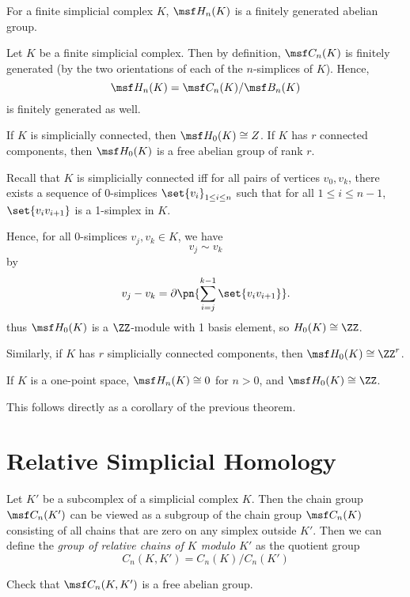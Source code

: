 \begin{problem}[18.7]
  For a finite simplicial complex $K$, $\msf H_n(K)$ is a finitely
  generated abelian group.
\end{problem}
\begin{solution}
  Let $K$ be a finite simplicial complex. Then by definition, $\msf
  C_n(K)$ is finitely generated (by the two orientations of each of
  the $n$-simplices of $K$). Hence,
  \[
    \msf H_n(K) = \msf C_n(K)/\msf B_n(K)
  \]
  is finitely generated as well.
\end{solution}
\begin{problem}[18.8]
  If $K$ is simplicially connected, then $\msf H_0(K) \cong Z$. If $K$
  has $r$ connected components, then $\msf H_0(K)$ is a free abelian
  group of rank $r$.
\end{problem}
\begin{solution}
  Recall that $K$ is simplicially connected iff for all pairs of
  vertices $v_0, v_k$, there exists a sequence of 0-simplices
  $\set{v_i}_{1 \leq i \leq n}$ such that for all $1 \leq i \leq n-1$,
  $\set{v_iv_{i+1}}$ is a 1-simplex in $K$.

  Hence, for all 0-simplices $v_j, v_k \in K$, we have
  \[
    v_j \sim v_k
  \]
  by
  \[
    v_j - v_k = \partial\pn{\sum_{i=j}^{k-1} \set{v_iv_{i+1}}}.
  \]
  thus $\msf H_0(K)$ is a $\ZZ$-module with 1 basis element, so
  $H_0(K) \cong \ZZ$.

  Similarly, if $K$ has $r$ simplicially connected components, then
  $\msf H_0(K) \cong \ZZ^r$.
\end{solution}
\begin{problem}[18.9]
  If $K$ is a one-point space, $\msf H_n(K) \cong 0$ for $n > 0$, and
  $\msf H_0(K) \cong \ZZ$.
\end{problem}
\begin{solution}
  This follows directly as a corollary of the previous theorem.
\end{solution}

\section{Relative Simplicial Homology}
\begin{definition}
  Let $K'$ be a subcomplex of a simplicial complex $K$. Then the chain
  group $\msf C_n(K')$ can be viewed as a subgroup of the chain group
  $\msf C_n(K)$ consisting of all chains that are zero on any simplex
  outside $K'$. Then we can define the \emph{group of relative chains
    of $K$ modulo $K'$} as the quotient group
  \[
    C_n(K, K') = C_n(K)/C_n(K')
  \]
\end{definition}
\begin{problem}[18.15]
  Check that $\msf C_n(K,K')$ is a free abelian group.
\end{problem}


